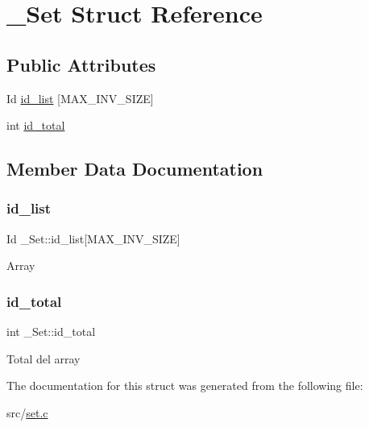 \hypertarget{struct__Set}{}\section{\+\_\+\+Set Struct Reference}
\label{struct__Set}
\subsection*{Public Attributes}
\begin{DoxyCompactItemize}
\item 
Id \hyperlink{struct__Set_adde563bd36bf2d00bd5a49b493c4f3bb}{id\+\_\+list} \mbox{[}M\+A\+X\+\_\+\+I\+N\+V\+\_\+\+S\+I\+ZE\mbox{]}
\item 
int \hyperlink{struct__Set_afe941cf156f1000d962bff58835ba853}{id\+\_\+total}
\end{DoxyCompactItemize}


\subsection{Member Data Documentation}
\mbox{\label{struct__Set_adde563bd36bf2d00bd5a49b493c4f3bb}} 
\subsubsection{\texorpdfstring{id\+\_\+list}{id\_list}}
{\footnotesize\ttfamily Id \+\_\+\+Set\+::id\+\_\+list\mbox{[}M\+A\+X\+\_\+\+I\+N\+V\+\_\+\+S\+I\+ZE\mbox{]}}

Array \mbox{\label{struct__Set_afe941cf156f1000d962bff58835ba853}} 
\subsubsection{\texorpdfstring{id\+\_\+total}{id\_total}}
{\footnotesize\ttfamily int \+\_\+\+Set\+::id\+\_\+total}

Total del array 

The documentation for this struct was generated from the following file\+:\begin{DoxyCompactItemize}
\item 
src/\hyperlink{set_8c}{set.\+c}\end{DoxyCompactItemize}

